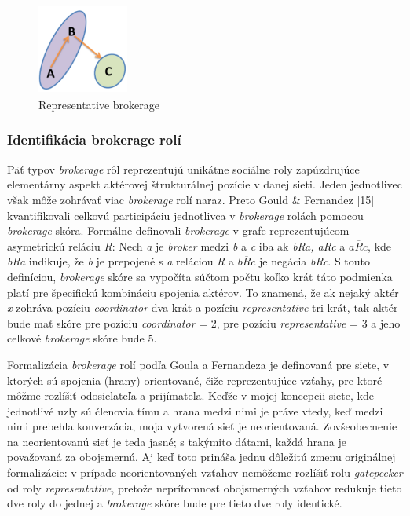 \documentclass[slovak,master,public,dept460,male,cpdeclaration,oneside]{diploma}
\begin{document}
\begin{figure}[H]
\centering
\includegraphics[width=3cm, height=3cm]{figures/representative}
\caption{Representative brokerage}
\label{representative}
\end{figure}

\subsubsection{Identifikácia brokerage rolí}
Päť typov \textit{brokerage} rôl  reprezentujú unikátne sociálne roly zapúzdrujúce elementárny aspekt aktérovej štrukturálnej pozície v danej sieti. Jeden jednotlivec však môže zohrávať viac \textit{brokerage} rolí naraz. Preto Gould \& Fernandez [15] kvantifikovali celkovú participáciu jednotlivca v \textit{brokerage} rolách pomocou \textit{brokerage} skóra. Formálne definovali \textit{brokerage} v grafe reprezentujúcom asymetrickú reláciu \textit{R}: Nech \textit{a} je \textit{broker} medzi \textit{b} a \textit{c} iba ak \textit{bRa, aRc} a   ${ a\overline{R}c }$, kde \textit{bRa} indikuje, že \textit{b} je prepojené s \textit{a} reláciou \textit{R} a ${ b\overline{R}c }$
je negácia \textit{bRc}. S touto definíciou, \textit{brokerage} skóre sa vypočíta súčtom počtu koľko krát táto podmienka platí pre špecifickú kombináciu spojenia aktérov. To znamená, že ak nejaký aktér \textit{x} zohráva pozíciu \textit{coordinator} dva krát a pozíciu \textit{representative} tri krát, tak aktér bude mať skóre pre pozíciu \textit{coordinator} = 2, pre pozíciu  \textit{representative} = 3 a jeho celkové \textit{brokerage} skóre bude 5.


Formalizácia \textit{brokerage} rolí podľa Goula a Fernandeza je definovaná pre siete, v ktorých sú spojenia (hrany) orientované, čiže reprezentujúce vzťahy, pre ktoré môžme rozlíšiť odosielateľa a prijímateľa. Keďže v mojej koncepcii siete, kde jednotlivé uzly sú členovia tímu a hrana medzi nimi je práve vtedy, keď medzi nimi prebehla konverzácia, moja vytvorená sieť je neorientovaná. Zovšeobecnenie na neorientovanú sieť je teda jasné; s takýmito dátami, každá hrana je považovaná za obojsmernú. Aj keď toto prináša jednu dôležitú zmenu originálnej formalizácie: v prípade neorientovaných vzťahov nemôžeme rozlíšiť rolu \textit{gatepeeker} od roly \textit{representative}, pretože neprítomnosť obojsmerných vzťahov redukuje tieto dve roly do jednej a \textit{brokerage} skóre bude pre tieto dve roly identické. \cite{19}
\end{document}
